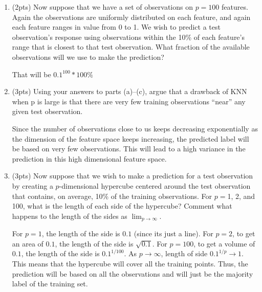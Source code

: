 \documentclass[a4paper]{article}
\theoremstyle{definition}
\newenvironment{soln}{
    \leavevmode\color{blue}\ignorespaces
}{}
\begin{document}
\begin{enumerate}
\begin{enumerate}
	\item (2pts) Now suppose that we have a set of observations on $p = 100$ features. Again the observations are uniformly distributed on each feature, and again each feature ranges in value from 0 to 1. We wish to predict a test observation’s response using observations within the 10\% of each feature’s range that is closest to that test observation. What fraction of the available observations will we use to make the prediction?
	
	\begin{soln}
		That will be $0.1^{100} * 100 \%$
	\end{soln}
	
	\item (3pts) Using your answers to parts (a)–(c), argue that a drawback of KNN when p is large is that there are very few training observations “near” any given test observation.
	
	\begin{soln}
	Since the number of observations close to us keeps decreasing exponentially as the dimension of the feature space keeps increasing, the predicted label will be based on very few observations. This will lead to a high variance in the prediction in this high dimensional feature space.
	\end{soln}
	
	\item (3pts) Now suppose that we wish to make a prediction for a test observation by creating a $p$-dimensional hypercube centered around the test observation that contains, on average, 10\% of the training observations. For $p =$1, 2, and 100, what is the length of each side of the hypercube? Comment what happens to the length of the sides as $\lim_{{p \to \infty}}$.
	
	\begin{soln}
		For $p = 1$, the length of the side is $0.1$ (since its just a line). For $p = 2$, to get an area of $0.1$, the length of the side is $\sqrt{0.1}$. For $p = 100$, to get a volume of $0.1$, the length of the side is $0.1^{1/100}$. As $p \to \infty$, length of side $0.1 ^{1/p} \to 1$. This means that the hypercube will cover all the training points. Thus, the prediction will be based on all the observations and will just be the majority label of the training set.
	\end{soln}
	
\end{enumerate}


\end{enumerate}
\end{document}
